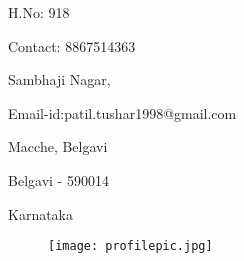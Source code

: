 \documentclass{article}
\begin{document}
	
	\begin{minipage}{2in}
	H.No: 918
	\end{minipage}
	\hfill
	\begin{minipage}{2.25in}
	Contact: 8867514363
	\end{minipage}

	
	\begin{minipage}{2in}
	Sambhaji Nagar,
	\end{minipage}
	\hfill
	Email-id:patil.tushar1998@gmail.com
	
	\begin{minipage}{2in}
	Macche, Belgavi
	\end{minipage}
	
	\begin{minipage}{2in}
	Belgavi - 590014
	\end{minipage}

	\begin{minipage}{2in}
	Karnataka
	\end{minipage}

	\begin{figure}[h!]
		\hfill
		\texttt{[image: profilepic.jpg]}
		\label{image_1} %
	\end{figure}
	
\end{document}
